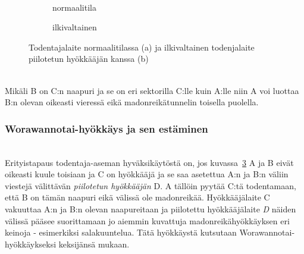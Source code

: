 \documentclass[finnish]{tktltiki2}
\theoremstyle{definition}
\theoremstyle{remark}
\begin{document}
\noindent\\
\begin{figure}[h]
	\begin{subfigure}{.5\textwidth}
		\centering
		\caption{normaalitila}
		\label{fig:todentaja1}
	\end{subfigure}%
	\begin{subfigure}{.5\textwidth}
		\centering
		\caption{ilkivaltainen}
		\label{fig:todentaja2}
	\end{subfigure}%
	\caption{Todentajalaite normaalitilassa (a) ja ilkivaltainen todenjalaite piilotetun hyökkääjän kanssa (b)}
	\label{fig:todentajalaitteet}
\end{figure}
\noindent\\
Mikäli B on C:n naapuri ja se on eri sektorilla C:lle kuin A:lle niin A voi luottaa B:n olevan oikeasti vieressä eikä madonreikätunnelin toisella puolella.

\subsubsection{Worawannotai-hyökkäys ja sen estäminen}
\noindent\\
Erityistapaus todentaja-aseman hyväksikäytöstä on, jos kuvassa~\ref{fig:todentajalaitteet} A ja B eivät oikeasti kuule toisiaan ja C on hyökkääjä ja se saa asetettua A:n ja B:n väliin viestejä välittävän \emph{piilotetun hyökkääjän} D. A tällöin pyytää C:tä todentamaan, että B on tämän naapuri eikä välissä ole madonreikää. Hyökkääjälaite C vakuuttaa A:n ja B:n olevan naapureitaan ja piilotettu hyökkääjälaite \emph{D} näiden välissä pääsee suorittamaan jo aiemmin kuvattuja madonreikähyökkäyksen eri keinoja - esimerkiksi salakuuntelua. Tätä hyökkäystä kutsutaan Worawannotai-hyökkäykseksi keksijänsä mukaan.
\end{document}
